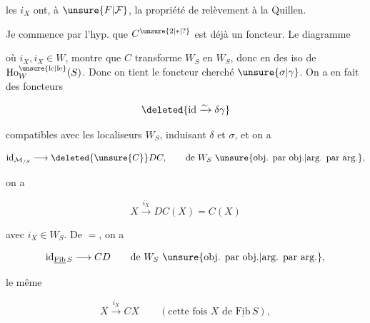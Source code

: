 
les $i_X$ ont,  à $\unsure{F|\mathcal F}$, la propriété de relèvement à la Quillen.

Je commence par l'hyp. que $C^{\unsure{2|*|?}}$ est déjà un foncteur. Le diagramme


où $i_X,i_X\in W$, montre que $C$ transforme $W_S$ en $W_S$, donc en des iso de $\mathrm{Ho}^{\unsure{\mathrm{lc}|\mathrm{le}}}_W(S)$. Donc on tient le foncteur cherché $\unsure{\sigma|\gamma}$. On a en fait des foncteurs

\[
\deleted{\mathrm{id}\xrightarrow{\sim}\delta\gamma}
\]



compatibles avec les localiseurs $W_S$, induisant $\delta$ et $\sigma$, et on a

\[
\mathrm{id}_{\mathcal M_{/S}}\longrightarrow\deleted{\unsure{C}}DC,\qquad\text{de }W_S\ \text{\unsure{obj. par obj.|arg. par arg.}},
\]

 on a 

\[
X\xrightarrow{i_X}DC(X)=C(X)
\]

avec $i_X\in W_S$. De $=$, on a

\[
\mathrm{id}_{\underline{\mathrm{Fib}}\,S}\longrightarrow CD\qquad\text{de }W_S\ \text{\unsure{obj. par obj.|arg. par arg.}},
\]

 le même

\[
X\xrightarrow{i_X}CX\qquad(\text{cette fois }X\text{ de }\underline{\mathrm{Fib}}\,S),
\]
